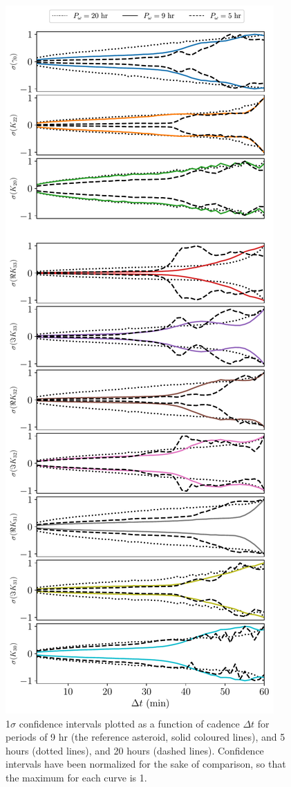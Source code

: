 \documentclass[fleqn,usenatbib]{mnras}
\begin{document}
\begin{figure}
  \centering
  \includegraphics[height=0.89\textheight]{figs/cad-period.pdf}
  \caption{1$\sigma$ confidence intervals plotted as a function of cadence $\Delta t$ for periods of 9 hr (the reference asteroid, solid coloured lines), and 5 hours (dotted lines), and 20 hours (dashed lines). Confidence intervals have been normalized for the sake of comparison, so that the maximum for each curve is 1.}
  \label{fig:cad-period}
\end{figure}
\end{document}

